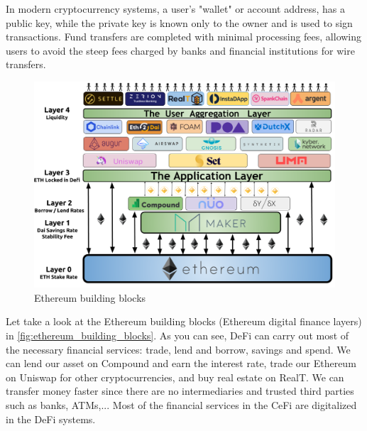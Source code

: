 In modern cryptocurrency systems, a user's "wallet" or account address, has a public key, while the private key is known only to the owner and is used to sign transactions. Fund transfers are completed with minimal processing fees, allowing users to avoid the steep fees charged by banks and financial institutions for wire transfers.




\begin{figure}[h]
  \centering
  \includegraphics[width=.60\textwidth]{images/ethereum_building_blocks.png}
  \caption[Ethereum building blocks]{Ethereum building blocks}
  \label{fig:ethereum_building_blocks}
\end{figure}

Let take a look at the Ethereum building blocks (Ethereum digital finance layers) in \autoref{fig:ethereum_building_blocks}. As you can see, DeFi can carry out most of the necessary financial services: trade, lend and borrow, savings and spend. We can lend our asset on Compound and earn the interest rate, trade our Ethereum on Uniswap for other cryptocurrencies, and buy real estate on RealT. We can transfer money faster since there are no intermediaries and trusted third parties such as banks, ATMs,... Most of the financial services in the CeFi are digitalized in the DeFi systems.


